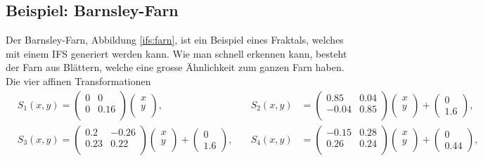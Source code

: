 \subsection{Beispiel: Barnsley-Farn}
Der Barnsley-Farn, Abbildung \ref{ifs:farn}, ist ein Beispiel eines Fraktals, welches mit einem IFS generiert werden kann.
Wie man schnell erkennen kann, besteht der Farn aus Blättern, welche eine grosse Ähnlichkeit zum ganzen Farn haben.
Die vier affinen Transformationen
\begin{align}
	& {S_1(x,y)}
	= 
	\begin{pmatrix}
		0 & 0 \\
		0 & 0.16 \\
	\end{pmatrix}
	\begin{pmatrix}
		x\\
		y\\
	\end{pmatrix}, \quad &
	{S_2(x,y)}
	&= 
	\begin{pmatrix}
		0.85 & 0.04 \\
		-0.04 & 0.85 \\
	\end{pmatrix}
	\begin{pmatrix}
		x\\
		y\\
	\end{pmatrix} 
	+
	\begin{pmatrix}
		0 \\
		1.6
	\end{pmatrix},\\
	& {S_3(x,y)}
	= 
	\begin{pmatrix}
		0.2 & -0.26 \\
		0.23 & 0.22 \\
	\end{pmatrix}
	\begin{pmatrix}
		x\\
		y\\
	\end{pmatrix} 
	+
	\begin{pmatrix}
		0 \\
		1.6
	\end{pmatrix}, \quad &
	{S_4(x,y)}
	&= 
	\begin{pmatrix}
		-0.15 & 0.28 \\
		0.26 & 0.24 \\
	\end{pmatrix}
	\begin{pmatrix}
		x\\
		y\\
	\end{pmatrix} 
	+
	\begin{pmatrix}
		0 \\
		0.44
	\end{pmatrix},\\
	\label{ifs:farnFormel}
\end{align}
